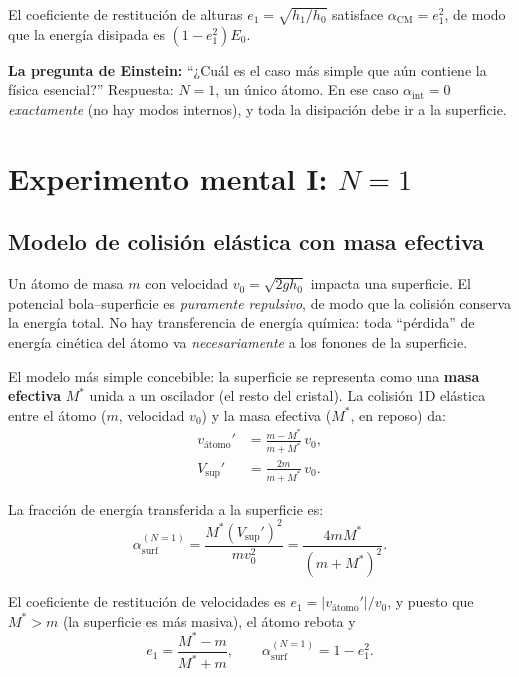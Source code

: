 \documentclass[11pt, a4paper]{article}
\begin{document}
El coeficiente de restitución de alturas $e_1 = \sqrt{h_1/h_0}$ satisface
$\alpha_\text{CM} = e_1^2$, de modo que la energía disipada es $(1-e_1^2)E_0$.

\begin{mdframed}[style=pregunta]
\textbf{La pregunta de Einstein:} ``¿Cuál es el caso más simple que aún
contiene la física esencial?'' Respuesta: $N=1$, un único átomo.
En ese caso $\alpha_\text{int} = 0$ \emph{exactamente} (no hay modos
internos), y toda la disipación debe ir a la superficie.
\end{mdframed}

\section{Experimento mental I: \texorpdfstring{$N=1$}{N=1}}

\subsection{Modelo de colisión elástica con masa efectiva}

Un átomo de masa $m$ con velocidad $v_0 = \sqrt{2gh_0}$ impacta una
superficie. El potencial bola--superficie es \emph{puramente repulsivo}, de
modo que la colisión conserva la energía total. No hay transferencia de
energía química: toda ``pérdida'' de energía cinética del átomo va
\emph{necesariamente} a los fonones de la superficie.

El modelo más simple concebible: la superficie se representa como una
\textbf{masa efectiva} $M^*$ unida a un oscilador (el resto del cristal).
La colisión 1D elástica entre el átomo ($m$, velocidad $v_0$) y la masa
efectiva ($M^*$, en reposo) da:
\begin{align}
  v_\text{átomo}' &= \frac{m - M^*}{m + M^*}\,v_0, \\[4pt]
  V_\text{sup}'   &= \frac{2m}{m + M^*}\,v_0.
\end{align}

La fracción de energía transferida a la superficie es:
\begin{equation}
  \alpha_\text{surf}^{(N=1)} = \frac{M^* (V_\text{sup}')^2}{mv_0^2}
  = \frac{4mM^*}{(m+M^*)^2}.
  \label{eq:alfa_surf_N1}
\end{equation}

El coeficiente de restitución de velocidades es $e_1 = |v_\text{átomo}'|/v_0$,
y puesto que $M^* > m$ (la superficie es más masiva), el átomo rebota y
\begin{equation}
  \boxed{e_1 = \frac{M^* - m}{M^* + m}, \qquad
  \alpha_\text{surf}^{(N=1)} = 1 - e_1^2.}
  \label{eq:e1_N1}
\end{equation}
\end{document}
